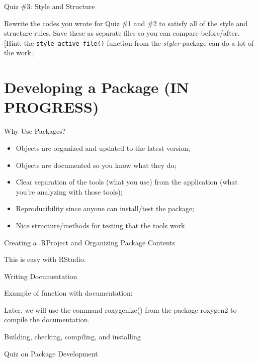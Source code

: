 \documentclass[10pt,ignorenonframetext,]{beamer}
\begin{document}
\begin{frame}[fragile]{Quiz \#3: Style and Structure}

Rewrite the codes you wrote for Quiz \#1 and \#2 to satisfy all of the
style and structure rules. Save these as separate files so you can
compare before/after. {[}Hint: the \texttt{style\_active\_file()}
function from the \emph{styler} package can do a lot of the work.{]}

\end{frame}

\section{Developing a Package (IN
PROGRESS)}\label{developing-a-package-in-progress}

\begin{frame}{Why Use Packages?}

\begin{itemize}
\item
  Objects are organized and updated to the latest version;
\item
  Objects are documented so you know what they do;
\item
  Clear separation of the tools (what you use) from the application
  (what you're analyzing with those tools);
\item
  Reproducibility since anyone can install/test the package;
\item
  Nice structure/methods for testing that the tools work.
\end{itemize}

\end{frame}

\begin{frame}{Creating a .RProject and Organizing Package Contents}

This is easy with RStudio.

\end{frame}

\begin{frame}{Writing Documentation}

Example of function with documentation:

Later, we will use the command roxygenize() from the package roxygen2 to
compile the documentation.

\end{frame}

\begin{frame}{Building, checking, compiling, and installing}

\end{frame}

\begin{frame}{Quiz on Package Development}

\end{frame}
\end{document}
